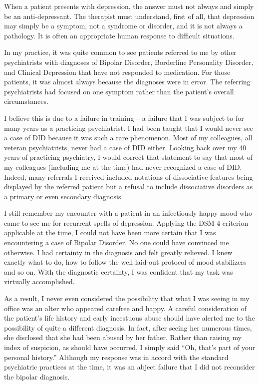 \documentclass[]{book}
\begin{document}
When a patient presents with depression, the answer must not always and simply be an anti-depressant. The therapist must understand, first of all, that depression may simply be a symptom, not a syndrome or disorder, and it is not always a pathology. It is often an appropriate human response to difficult situations.

In my practice, it was quite common to see patients referred to me by other psychiatrists with diagnoses of Bipolar Disorder, Borderline Personality Disorder, and Clinical Depression that have not responded to medication. For those patients, it was almost always because the diagnoses were in error. The referring psychiatrists had focused on one symptom rather than the patient's overall circumstances.

I believe this is due to a failure in training -- a failure that I was subject to for many years as a practicing psychiatrist. I had been taught that I would never see a case of DID because it was such a rare phenomenon. Most of my colleagues, all veteran psychiatrists, never had a case of DID either. Looking back over my 40 years of practicing psychiatry, I would correct that statement to say that most of my colleagues (including me at the time) had never recognized a case of DID. Indeed, many referrals I received included notations of dissociative features being displayed by the referred patient but a refusal to include dissociative disorders as a primary or even secondary diagnosis.

I still remember my encounter with a patient in an infectiously happy mood who came to see me for recurrent spells of depression. Applying the DSM 4 criterion applicable at the time, I could not have been more certain that I was encountering a case of Bipolar Disorder. No one could have convinced me otherwise. I had certainty in the diagnosis and felt greatly relieved. I knew exactly what to do, how to follow the well laid-out protocol of mood stabilizers and so on. With the diagnostic certainty, I was confident that my task was virtually accomplished.

As a result, I never even considered the possibility that what I was seeing in my office was an alter who appeared carefree and happy. A careful consideration of the patient's life history and early incestuous abuse should have alerted me to the possibility of quite a different diagnosis. In fact, after seeing her numerous times, she disclosed that she had been abused by her father. Rather than raising my index of suspicion, as should have occurred, I simply said ``Oh, that's part of your personal history.'' Although my response was in accord with the standard psychiatric practices at the time, it was an abject failure that I did not reconsider the bipolar diagnosis.
\end{document}
